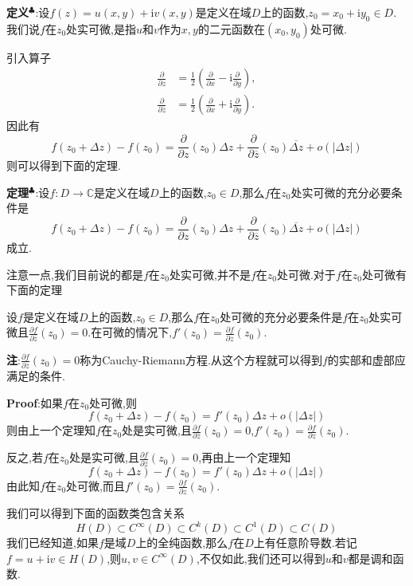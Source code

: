 \qquad \textbf{定义}$^\clubsuit $:设$f(z)=u(x,y)+\mathrm{i}v(x,y)$是定义在域$D$上的函数,$z_0=x_0+\mathrm{i}y_0\in D$.我们说$f$在$z_0$处实可微,是指$u$和$v$作为$x,y$的二元函数在$(x_0,y_0)$处可微.\par
引入算子
$$
\begin{aligned}
    \frac{\partial}{\partial z}&=\frac{1}{2}\left(\frac{\partial}{\partial x}-\mathrm{i}\frac{\partial}{\partial y}\right),\\
    \frac{\partial}{\partial \overline{z}}&=\frac{1}{2}\left(\frac{\partial}{\partial x}+\mathrm{i}\frac{\partial}{\partial y}\right).
\end{aligned}
$$
因此有
$$
f(z_0+\Delta z)-f(z_0)=\frac{\partial}{\partial z}(z_0)\Delta z+\frac{\partial}{\partial \overline{z}}(z_0)\overline{\Delta z}+o(|\Delta z|)
$$
则可以得到下面的定理.\par
\textbf{定理}$^\clubsuit $:设$f:D\to \mathbb{C}$是定义在域$D$上的函数,$z_0\in D$,那么$f$在$z_0$处实可微的充分必要条件是
$$
f(z_0+\Delta z)-f(z_0)=\frac{\partial}{\partial z}(z_0)\Delta z+\frac{\partial}{\partial \overline{z}}(z_0)\overline{\Delta z}+o(|\Delta z|)
$$
成立.\par
注意一点,我们目前说的都是$f$在$z_0$处实可微,并不是$f$在$z_0$处可微.对于$f$在$z_0$处可微有下面的定理
\begin{tcolorbox}[colback=KuangNei,colframe=BianKuang,title=\textbf{Cauchy-Riemann方程},sharpish corners]
    设$f$是定义在域$D$上的函数,$z_0\in D$,那么$f$在$z_0$处可微的充分必要条件是$f$在$z_0$处实可微且$\frac{\partial f}{\partial \overline{z}}(z_0)=0$.在可微的情况下,$f'(z_0)=\frac{\partial f}{\partial z}(z_0)$.
\end{tcolorbox}
\textbf{注}:$\frac{\partial f}{\partial \overline{z}}(z_0)=0$称为Cauchy-Riemann方程.从这个方程就可以得到$f$的实部和虚部应满足的条件.\par
\textbf{Proof}:如果$f$在$z_0$处可微,则
$$
f(z_0+\Delta z)-f(z_0)=f'(z_0)\Delta z+o(|\Delta z|)
$$
则由上一个定理知$f$在$z_0$处是实可微,且$\frac{\partial f}{\partial \overline{z}}(z_0)=0$,$f'(z_0)=\frac{\partial f}{\partial z}(z_0)$.\par
反之,若$f$在$z_0$处是实可微,且$\frac{\partial f}{\partial \overline{z}}(z_0)=0$,再由上一个定理知
$$
f(z_0+\Delta z)-f(z_0)=f'(z_0)\Delta z+o(|\Delta z|)
$$
由此知$f$在$z_0$处可微,而且$f'(z_0)=\frac{\partial f}{\partial z}(z_0)$.\par
我们可以得到下面的函数类包含关系
$$
H(D)\subset C^\infty(D)\subset C^k(D)\subset C^1(D)\subset C(D)
$$
\qquad 我们已经知道,如果$f$是域$D$上的全纯函数,那么$f$在$D$上有任意阶导数.若记$f=u+\mathrm{i}v\in H(D)$,则$u,v\in C^{\infty}(D)$,不仅如此,我们还可以得到$u$和$v$都是调和函数.\par
